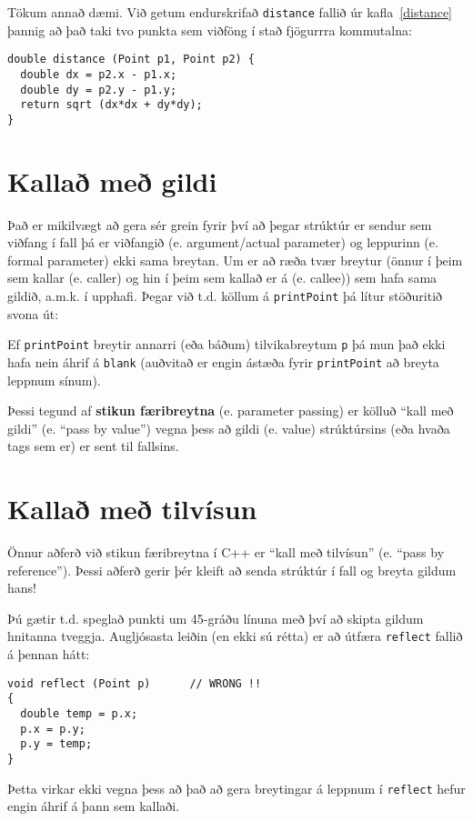 Tökum annað dæmi.  Við getum endurskrifað {\tt distance} fallið úr kafla~\ref{distance} þannig að það taki tvo punkta sem viðföng í stað fjögurrra kommutalna:

\begin{verbatim}
double distance (Point p1, Point p2) {
  double dx = p2.x - p1.x;
  double dy = p2.y - p1.y;
  return sqrt (dx*dx + dy*dy);
}
\end{verbatim}

\section{Kallað með gildi}

Það er mikilvægt að gera sér grein fyrir því að þegar strúktúr er sendur sem viðfang í fall þá er viðfangið (e. argument/actual parameter) og leppurinn (e. formal parameter) ekki sama breytan.
Um er að ræða tvær breytur (önnur í þeim sem kallar (e. caller) og hin í þeim sem kallað er á (e. callee)) sem hafa sama gildið, a.m.k. í upphafi.
Þegar við t.d. köllum á {\tt printPoint} þá lítur stöðuritið svona út: 

\vspace{0.1in}
\centerline{}
\vspace{0.1in}
%
Ef {\tt printPoint} breytir annarri (eða báðum) tilvikabreytum {\tt p} þá mun það ekki hafa nein áhrif á {\tt blank} (auðvitað er engin ástæða fyrir {\tt printPoint} að breyta leppnum sínum).

Þessi tegund af {\bf stikun færibreytna} (e. parameter passing) er kölluð ``kall með gildi'' (e. ``pass by value'')
vegna þess að gildi (e. value) strúktúrsins (eða hvaða tags sem er) er sent til fallsins.

\section{Kallað með tilvísun}

Önnur aðferð við stikun færibreytna í C++ er ``kall með tilvísun'' (e. ``pass by reference'').
Þessi aðferð gerir þér kleift að senda strúktúr í fall og breyta gildum hans!

Þú gætir t.d. speglað punkti um 45-gráðu línuna með því að skipta gildum hnitanna tveggja.
Augljósasta leiðin (en ekki sú rétta) er að útfæra {\tt reflect} fallið á þennan hátt:

\begin{verbatim}
void reflect (Point p)      // WRONG !!
{
  double temp = p.x;
  p.x = p.y;
  p.y = temp;
}
\end{verbatim}
%
Þetta virkar ekki vegna þess að það að gera breytingar á leppnum í {\tt reflect} hefur engin áhrif á þann sem kallaði.

